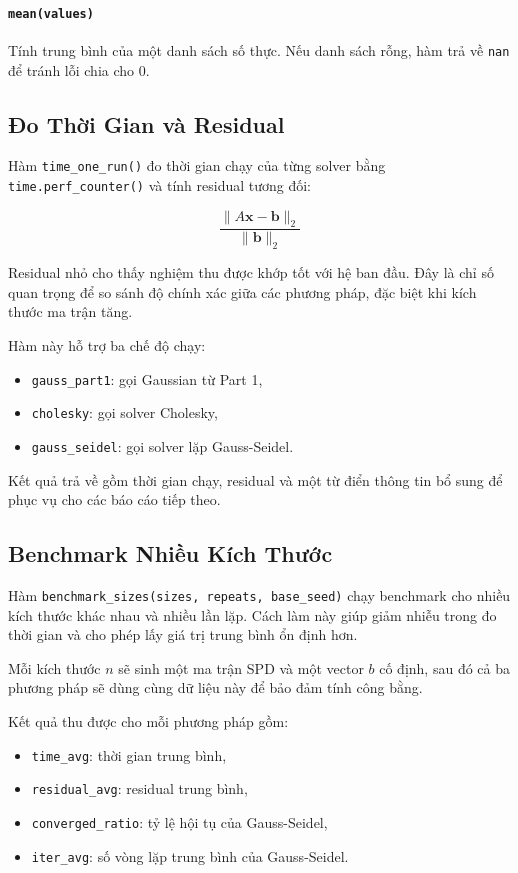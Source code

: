 \documentclass[12pt, a4paper, twoside]{article}
\begin{document}
\paragraph{\texttt{mean(values)}}
Tính trung bình của một danh sách số thực. Nếu danh sách rỗng, hàm trả về \texttt{nan} để tránh lỗi chia cho 0.

\subsection{Đo Thời Gian và Residual}

Hàm \texttt{time\_one\_run()} đo thời gian chạy của từng solver bằng \texttt{time.perf\_counter()} và tính residual tương đối:

\[
\frac{\|A\mathbf{x} - \mathbf{b}\|_2}{\|\mathbf{b}\|_2}
\]

Residual nhỏ cho thấy nghiệm thu được khớp tốt với hệ ban đầu. Đây là chỉ số quan trọng để so sánh độ chính xác giữa các phương pháp, đặc biệt khi kích thước ma trận tăng.

Hàm này hỗ trợ ba chế độ chạy:
\begin{itemize}
    \item \texttt{gauss\_part1}: gọi Gaussian từ Part 1,
    \item \texttt{cholesky}: gọi solver Cholesky,
    \item \texttt{gauss\_seidel}: gọi solver lặp Gauss-Seidel.
\end{itemize}

Kết quả trả về gồm thời gian chạy, residual và một từ điển thông tin bổ sung để phục vụ cho các báo cáo tiếp theo.

\subsection{Benchmark Nhiều Kích Thước}

Hàm \texttt{benchmark\_sizes(sizes, repeats, base\_seed)} chạy benchmark cho nhiều kích thước khác nhau và nhiều lần lặp. Cách làm này giúp giảm nhiễu trong đo thời gian và cho phép lấy giá trị trung bình ổn định hơn.

Mỗi kích thước $n$ sẽ sinh một ma trận SPD và một vector $b$ cố định, sau đó cả ba phương pháp sẽ dùng cùng dữ liệu này để bảo đảm tính công bằng.

Kết quả thu được cho mỗi phương pháp gồm:
\begin{itemize}
    \item \texttt{time\_avg}: thời gian trung bình,
    \item \texttt{residual\_avg}: residual trung bình,
    \item \texttt{converged\_ratio}: tỷ lệ hội tụ của Gauss-Seidel,
    \item \texttt{iter\_avg}: số vòng lặp trung bình của Gauss-Seidel.
\end{itemize}
\end{document}
